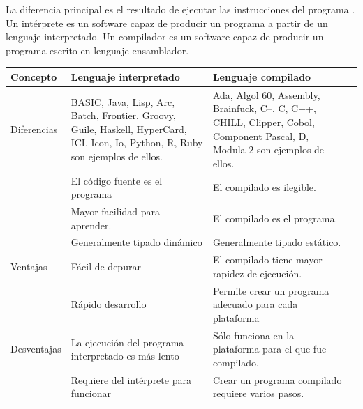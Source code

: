 \documentclass[12pt, letterpaper]{article}
\begin{document}
La diferencia principal es el resultado de ejecutar las instrucciones del programa \cite{Indiana}. Un int\'erprete es un software capaz de producir un programa a partir de un lenguaje interpretado. Un compilador es un software capaz de producir un programa escrito en lenguaje ensamblador. 

\begin{tabular}{ l | p{5cm} |  p{5cm} c}
	\textbf{Concepto}   & \textbf{Lenguaje interpretado} & \textbf{Lenguaje compilado} \\
  \hline
	Diferencias & \tabitem BASIC, Java, Lisp,  Arc, Batch, Frontier, Groovy, Guile, Haskell, HyperCard, ICI, Icon, Io, Python, R, Ruby \cite{dmoztools_interpreted} son ejemplos de ellos.& \tabitem Ada, Algol 60, Assembly, Brainfuck, C--, C, C++, CHILL, Clipper, Cobol, Component Pascal, D, Modula-2 \cite{dmoztools_compiled} son ejemplos de ellos. \\
				& \tabitem El c\'odigo fuente es el programa  & \tabitem El compilado es ilegible.  \\
	                & \tabitem Mayor facilidad para aprender. & \tabitem El compilado es el programa. \\
	                & \tabitem Generalmente tipado din\'amico & \tabitem Generalmente tipado est\'atico. \\
\hline
	Ventajas & \tabitem F\'acil de depurar & \tabitem El compilado tiene mayor rapidez de ejecuci\'on.  \\
	          & \tabitem R\'apido desarrollo & \tabitem Permite crear un programa adecuado para cada plataforma \\
\hline
	Desventajas & \tabitem La ejecuci\'on del programa interpretado es m\'as lento & \tabitem S\'olo funciona en la plataforma para el que fue compilado. \\
	 &\tabitem Requiere del int\'erprete para funcionar& \tabitem Crear un programa compilado requiere varios pasos.\\
\end{tabular}
\end{document}
